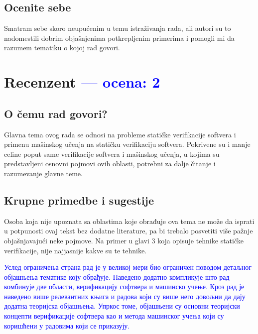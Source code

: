 \documentclass[a4paper]{report}
\newcommand{\odgovor}[1]{\textcolor{blue}{#1}}
\begin{document}
\section{Ocenite sebe}
Smatram sebe skoro neupućenim u temu istraživanja rada, ali autori su to nadomestili dobrim objašnjenima potkrepljenim primerima i pomogli mi da razumem tematiku o kojoj rad govori.

\chapter{Recenzent \odgovor{--- ocena: 2} }


\section{O čemu rad govori?}
Glavna tema ovog rada se odnosi na probleme statičke verifikacije softvera i primenu mašinskog učenja na statičku verifikaciju softvera. Pokrivene su i manje celine poput same verifikacije softvera i mašinskog učenja, u kojima su predstavljeni osnovni pojmovi ovih oblasti, potrebni za dalje čitanje i razumevanje glavne teme.

\section{Krupne primedbe i sugestije}
Osoba koja nije upoznata sa oblastima koje obrađuje ova tema ne može da isprati u potpunosti ovaj tekst bez dodatne literature, pa bi trebalo posvetiti više pažnje objašnjavajući neke pojmove. Na primer u glavi 3 koja opisuje tehnike statičke verifikacije, nije najjasnije kakve su te tehnike.

\odgovor{Услед ограничења страна рад је у великој мери био ограничен поводом детаљног објашњења тематике коју обрађује.
    Наведено додатно компликује што рад комбинује две области, верификацију софтвера и машинско учење. Кроз рад је наведено
    више релевантних књига и радова који су више него довољни да дају додатна теоријска објашњења. Упркос томе, објашњени су
    основни теоријски концепти верификације софтвера као и метода машинског учења који су коришћени у радовима који се приказују.}
\end{document}
